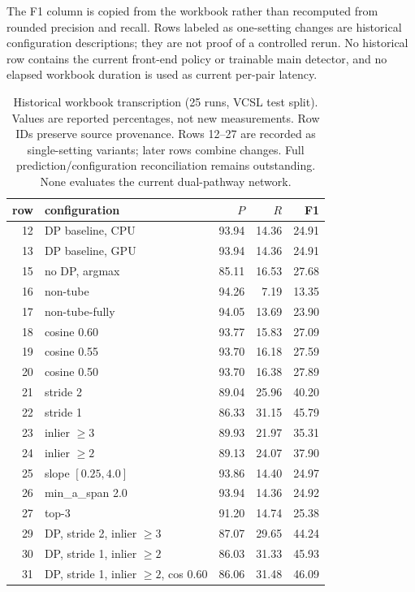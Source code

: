 \documentclass[10pt,twocolumn,letterpaper]{article}
\begin{document}
The F1 column is copied from the workbook rather than recomputed from rounded precision and
recall. Rows labeled as one-setting changes are historical configuration descriptions;
they are not proof of a controlled rerun. No historical row contains the current front-end
policy or trainable main detector, and no elapsed workbook duration is used as current
per-pair latency.

\begin{table}[t]
\centering
\small
\setlength{\tabcolsep}{4pt}
\caption{Historical workbook transcription (25 runs, VCSL test split). Values are reported
percentages, not new measurements. Row IDs preserve source provenance. Rows 12--27 are
recorded as single-setting variants; later rows combine changes. Full prediction/configuration
reconciliation remains outstanding. None evaluates the current dual-pathway network.}
\label{tab:s-hist}
\begin{tabular}{@{}r>{\raggedright\arraybackslash}p{8.2cm}rrr@{}}
\toprule
row & configuration & $P$ & $R$ & F1 \\
\midrule
12 & DP baseline, CPU & 93.94 & 14.36 & 24.91 \\
13 & DP baseline, GPU & 93.94 & 14.36 & 24.91 \\
15 & no DP, argmax & 85.11 & 16.53 & 27.68 \\
16 & non-tube & 94.26 & 7.19 & 13.35 \\
17 & non-tube-fully & 94.05 & 13.69 & 23.90 \\
18 & cosine 0.60 & 93.77 & 15.83 & 27.09 \\
19 & cosine 0.55 & 93.70 & 16.18 & 27.59 \\
20 & cosine 0.50 & 93.70 & 16.38 & 27.89 \\
21 & stride 2 & 89.04 & 25.96 & 40.20 \\
22 & stride 1 & 86.33 & 31.15 & 45.79 \\
23 & inlier $\ge3$ & 89.93 & 21.97 & 35.31 \\
24 & inlier $\ge2$ & 89.13 & 24.07 & 37.90 \\
25 & slope $[0.25,4.0]$ & 93.86 & 14.40 & 24.97 \\
26 & min\_a\_span 2.0 & 93.94 & 14.36 & 24.92 \\
27 & top-3 & 91.20 & 14.74 & 25.38 \\
29 & DP, stride 2, inlier $\ge3$ & 87.07 & 29.65 & 44.24 \\
30 & DP, stride 1, inlier $\ge2$ & 86.03 & 31.33 & 45.93 \\
31 & DP, stride 1, inlier $\ge2$, cos 0.60 & 86.06 & 31.48 & 46.09 \\

\end{tabular}
\end{table}
\end{document}
